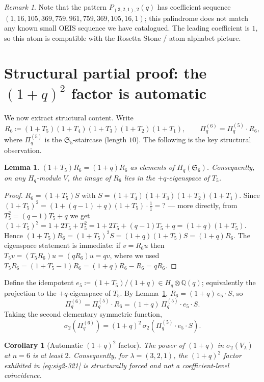 \documentclass[11pt]{article}
\theoremstyle{plain}
\newtheorem{lemma}[theorem]{Lemma}
\newtheorem{corollary}[theorem]{Corollary}
\theoremstyle{definition}
\theoremstyle{remark}
\newtheorem{remark}[theorem]{Remark}
\newcommand{\Q}{\mathbb{Q}}
\newcommand{\Sym}{\mathfrak{S}}
\newcommand{\Hq}{H_q}
\newcommand{\Pibs}{\Pi_q}
\begin{document}
\begin{remark}
Note that the pattern $P_{(3,2,1),2}(q)$ has coefficient sequence
$(1,16,105,369,759,961,759,369,105,16,1)$; this palindrome does not match
any known small OEIS sequence we have catalogued. The leading coefficient
is $1$, so this atom is compatible with the Rosetta Stone / atom alphabet
picture.
\end{remark}

\section{Structural partial proof: the $(1+q)^2$ factor is automatic}

We now extract structural content. Write
\[ R_6 \coloneqq (1+T_5)(1+T_4)(1+T_3)(1+T_2)(1+T_1), \qquad \Pibs^{(6)} = \Pibs^{(5)} \cdot R_6, \]
where $\Pibs^{(5)}$ is the $\Sym_5$-staircase (length $10$). The following
is the key structural observation.

\begin{lemma}\label{lem:T5R6}
$(1+T_5) R_6 = (1+q) R_6$ as elements of $\Hq(\Sym_6)$. Consequently, on any
$\Hq$-module $V$, the image of $R_6$ lies in the $+q$-eigenspace of $T_5$.
\end{lemma}

\begin{proof}
$R_6 = (1+T_5) S$ with $S = (1+T_4)(1+T_3)(1+T_2)(1+T_1)$. Since
$(1+T_5)^2 = (1+(q-1)+q)(1+T_5)\cdot\frac{1}{1} = ?$ --- more directly,
from $T_5^2 = (q-1)T_5 + q$ we get $(1+T_5)^2 = 1 + 2T_5 + T_5^2 = 1 + 2T_5 + (q-1)T_5 + q = (1+q)(1+T_5)$. Hence
$(1+T_5)R_6 = (1+T_5)^2 S = (1+q)(1+T_5) S = (1+q) R_6$. The eigenspace
statement is immediate: if $v = R_6 u$ then $T_5 v = (T_5 R_6) u = (q R_6)u = q v$,
where we used $T_5 R_6 = (1+T_5-1)R_6 = (1+q)R_6 - R_6 = q R_6$.
\end{proof}

Define the idempotent $e_5 \coloneqq (1+T_5)/(1+q) \in \Hq \otimes \Q(q)$;
equivalently the projection to the $+q$-eigenspace of $T_5$. By
Lemma~\ref{lem:T5R6}, $R_6 = (1+q)\, e_5 \cdot S$, so
\[ \Pibs^{(6)} = \Pibs^{(5)} \cdot R_6 = (1+q)\,\Pibs^{(5)} \cdot e_5 \cdot S. \]
Taking the second elementary symmetric function,
\[ \sigma_2(\Pibs^{(6)}) = (1+q)^2\, \sigma_2(\Pibs^{(5)} \cdot e_5 \cdot S). \]

\begin{corollary}[Automatic $(1+q)^2$ factor]\label{cor:auto-1plusq2}
The power of $(1+q)$ in $\sigma_2(V_\lambda)$ at $n = 6$ is at least $2$.
Consequently, for $\lambda = (3,2,1)$, the $(1+q)^2$ factor exhibited in
\eqref{eq:sig2-321} is \emph{structurally forced} and not a
coefficient-level coincidence.
\end{corollary}
\end{document}
